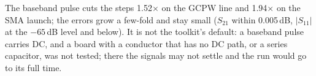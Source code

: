 The baseband pulse cuts the steps 1.52$\times$ on the GCPW line and 1.94$\times$ on the SMA launch; the errors grow a
few-fold and stay small ($S_{21}$ within 0.005\,dB, $|S_{11}|$ at the $-65$\,dB level and below). It is not the
toolkit's default: a baseband pulse carries DC, and a board with a conductor that has no DC path, or a series
capacitor, was not tested; there the signals may not settle and the run would go to its full time.
